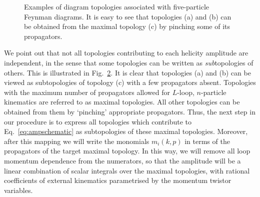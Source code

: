 \documentclass[main.tex]{subfiles}
\begin{document}
\begin{figure}
\begin{subfigure}[b]{0.3\textwidth}
    \caption{} \label{fig:topologyc}
    \end{subfigure}
\caption{Examples of diagram topologies associated with five-particle Feynman diagrams. It is easy to see that topologies (a) and (b) can be obtained from the maximal topology (c) by pinching some of its propagators.}
\label{fig:topologies}
\end{figure}

We point out that not all topologies contributing to each helicity amplitude are independent, in the sense that some topologies can be written as \textit{sub}topologies of others. This is illustrated in Fig.~\ref{fig:topologies}. It is clear that topologies (a) and (b) can be viewed as subtopologies of topology (c) with a few propagators absent. Topologies with the maximum number of propagators allowed for $L$-loop, $n$-particle kinematics are referred to as maximal topologies. All other topologies can be obtained from them by `pinching' appropriate propagators. Thus, the next step in our procedure is to express all topologies which contribute to Eq.~\ref{eq:ampschematic} as subtopologies of these maximal topologies. Moreover, after this mapping we will write the monomials $m_i(k, p)$ in terms of the propagators of the target maximal topology. In this way, we will remove all loop momentum dependence from the numerators, so that the amplitude will be a linear combination of scalar integrals over the maximal topologies, with rational coefficients of external kinematics parametrised by the momentum twistor variables.
\end{document}
